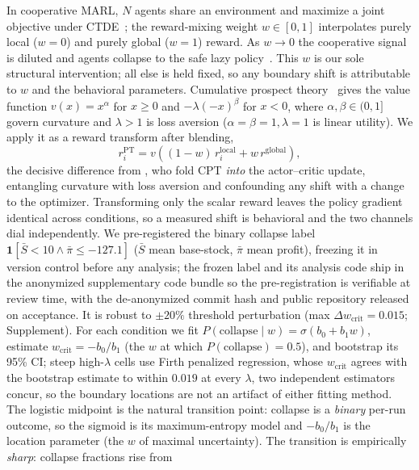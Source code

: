 \documentclass[letterpaper]{article} %
\theoremstyle{plain}
\newcommand{\wcrit}{w_{\mathrm{crit}}}
\newcommand{\PT}{\mathrm{PT}}
\begin{document}
In cooperative MARL, $N$ agents share an environment and maximize a joint objective under
CTDE~\citep{lowe2017multi}; the reward-mixing weight $w\in[0,1]$ interpolates purely local
($w{=}0$) and purely global ($w{=}1$) reward. As $w\!\to\!0$ the cooperative signal is diluted
and agents collapse to the safe lazy policy~\citep{liu2023lazy,peng2023curo}. This $w$ is our
sole structural intervention; all else is held fixed, so any boundary shift is attributable to
$w$ and the behavioral parameters. Cumulative prospect theory~\citep{kahneman1979,tversky1992}
gives the value function $v(x)=x^\alpha$ for $x\ge0$ and $-\lambda(-x)^\beta$ for $x<0$, where
$\alpha,\beta\in(0,1]$ govern curvature and $\lambda>1$ is loss aversion
($\alpha{=}\beta{=}1,\lambda{=}1$ is linear utility). We apply it as a reward transform after
blending,
\begin{equation}
 r_i^{\PT}=v\!\left((1-w)\,r_i^{\mathrm{local}}+w\,r^{\mathrm{global}}\right),
 \label{eq:reward}
\end{equation}
the decisive difference from \citet{lalmohammed2025}, who fold CPT \emph{into} the
actor--critic update, entangling curvature with loss aversion and confounding any shift with a
change to the optimizer. Transforming only the scalar reward leaves the policy gradient
identical across conditions, so a measured shift is behavioral and the two channels dial
independently. We pre-registered the binary collapse label
$\mathbf{1}[\bar S<10\wedge\bar\pi\le-127.1]$ ($\bar S$ mean base-stock, $\bar\pi$ mean profit),
freezing it in version control before any analysis; the frozen label and its analysis code ship in
the anonymized supplementary code bundle so the pre-registration is verifiable at review time, with
the de-anonymized commit hash and public repository released on acceptance. It is robust to
$\pm20\%$ threshold perturbation (max $\Delta\wcrit=0.015$;
Supplement). For
each condition we fit $P(\mathrm{collapse}\mid w)=\sigma(b_0+b_1 w)$, estimate
$\wcrit=-b_0/b_1$ (the $w$ at which $P(\mathrm{collapse})=0.5$), and bootstrap its 95\% CI; steep
high-$\lambda$ cells use Firth penalized regression, whose $\wcrit$ agrees with the bootstrap
estimate to within $0.019$ at every $\lambda$, two independent estimators concur, so the boundary
locations are not an artifact of either fitting method.
The logistic midpoint is the natural transition point: collapse is a \emph{binary} per-run outcome,
so the sigmoid is its maximum-entropy model and $-b_0/b_1$ is the location parameter (the $w$ of
maximal uncertainty). The transition is empirically \emph{sharp}: collapse fractions rise from
\end{document}
